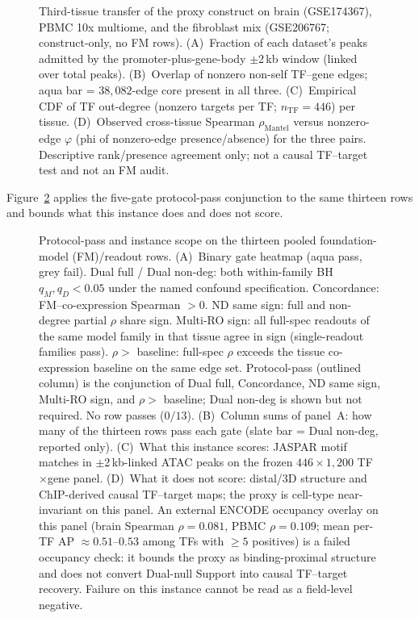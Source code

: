 \documentclass[fleqn,10pt,lineno]{wlpeerj}
\newcommand{\fitfig}[1]{\resizebox{\ifdim\width>\linewidth\linewidth\else\width\fi}{!}{#1}}
\begin{document}
\begin{figure}[!tbp]\centering
\fitfig{}
\caption{Third-tissue transfer of the proxy construct on brain (GSE174367), PBMC 10x multiome, and
the fibroblast mix (GSE206767; construct-only, no FM rows). (A)~Fraction of each dataset's peaks
admitted by the promoter-plus-gene-body $\pm$2\,kb window (linked over total peaks). (B)~Overlap
of nonzero non-self TF--gene edges; aqua bar = $38{,}082$-edge core present in all
three. (C)~Empirical CDF of TF out-degree (nonzero targets per TF; $n_{\mathrm{TF}}=446$) per
tissue. (D)~Observed cross-tissue Spearman $\rho_{\mathrm{Mantel}}$ versus nonzero-edge $\varphi$ (phi of
nonzero-edge presence/absence) for the three pairs. Descriptive rank/presence agreement only; not
a causal TF--target test and not an FM audit.}\label{fig:third_tissue}
\end{figure}

Figure~\ref{fig:protocol} applies the five-gate protocol-pass conjunction to the same thirteen rows
and bounds what this instance does and does not score.

\begin{figure}[!tbp]\centering
\fitfig{}
\caption{Protocol-pass and instance scope on the thirteen pooled foundation-model (FM)/readout
rows. (A)~Binary gate heatmap (aqua pass, grey fail). Dual full / Dual non-deg: both within-family
BH $q_M,q_D<0.05$ under the named confound specification. Concordance: FM--co-expression Spearman
$>0$. ND same sign: full and non-degree partial $\rho$ share sign. Multi-RO sign: all full-spec
readouts of the same model family in that tissue agree in sign (single-readout families pass).
$\rho>$ baseline: full-spec $\rho$ exceeds the tissue co-expression baseline on the same edge set.
Protocol-pass (outlined column) is the conjunction of Dual full, Concordance, ND same sign,
Multi-RO sign, and $\rho>$ baseline; Dual non-deg is shown but not required. No row passes
($0/13$). (B)~Column sums of panel~A: how many of the thirteen rows pass each gate (slate bar =
Dual non-deg, reported only). (C)~What this instance scores: JASPAR motif matches in
$\pm$2\,kb-linked ATAC peaks on the frozen $446\times 1{,}200$ TF$\times$gene panel. (D)~What it
does not score: distal/3D structure and ChIP-derived causal TF--target maps; the proxy is cell-type
near-invariant on this panel. An external ENCODE occupancy overlay on this panel (brain Spearman
$\rho=0.081$, PBMC $\rho=0.109$; mean per-TF AP $\approx0.51$--$0.53$ among TFs with $\ge5$
positives) is a failed occupancy check: it bounds the proxy as binding-proximal structure and does
not convert Dual-null Support into causal TF--target recovery. Failure on this instance cannot be
read as a field-level negative.}\label{fig:protocol}
\end{figure}
\end{document}
